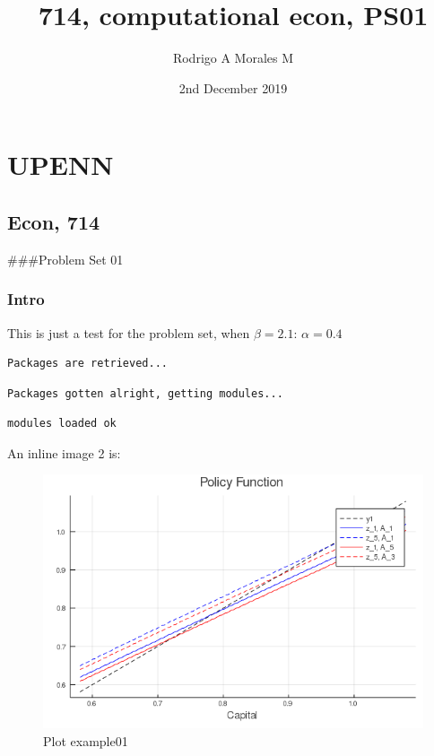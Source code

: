 \documentclass[12pt,a4paper]{article}
\title{ 714, computational econ, PS01 }
\author{ Rodrigo A Morales M }
\date{ 2nd December 2019 }
\begin{document}
\maketitle

\section{UPENN}
\subsection{Econ, 714}
\#\#\#Problem Set 01

\subsubsection{Intro}
This is just a test for the problem set, when $\beta =2.1$: $\alpha = 0.4$


\begin{lstlisting}
Packages are retrieved...
\end{lstlisting}


\begin{lstlisting}
Packages gotten alright, getting modules...
\end{lstlisting}


\begin{lstlisting}
modules loaded ok
\end{lstlisting}


An inline image 2 is: \begin{figure}
\centering
\includegraphics{Plots/000_PolicyFunction_a_fixed_grid_20191129.png}
\caption{Plot example01}
\end{figure}
\end{document}
